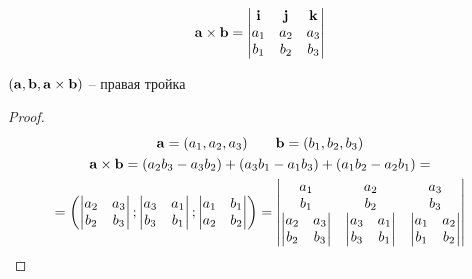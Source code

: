 \begin{remark}
    \[\mathbf{a} \times \mathbf{b} =
        \begin{vmatrix}
            \mathbf{i} & \mathbf{j} & \mathbf{k} \\
            a_1 & a_2 & a_3 \\
            b_1 & b_2 & b_3 \\
        \end{vmatrix}\]
\end{remark}

\begin{theorem}
    $(\mathbf{a}, \mathbf{b}, \mathbf{a} \times\mathbf{b})$ -- правая тройка
\end{theorem}
\begin{proof}
    \begin{gather*}
        \mathbf{a} = (a_1, a_2, a_3) \qquad \mathbf{b} = (b_1, b_2,b_3)\\
        \mathbf{a} \times \mathbf{b} =(a_2 b_3 - a_3 b_2) + (a_3 b_1 - a_1 b_3) + (a_1b_2 - a_2 b_1) =\\
        =\left(
        \begin{vmatrix}
            a_2 & a_3 \\
            b_2 & b_3
        \end{vmatrix};
        \begin{vmatrix}
            a_3 & a_1 \\
            b_3 & b_1
        \end{vmatrix};
        \begin{vmatrix}
            a_1 & b_1 \\
            a_2 & b_2
        \end{vmatrix}
        \right)
        = \begin{vmatrix}
            a_1             & a_2 & a_3 \\
            b_1             & b_2 & b_3 \\
            \begin{vmatrix}
                a_2 & a_3 \\
                b_2 & b_3
            \end{vmatrix} &
            \begin{vmatrix}
                a_3 & a_1 \\
                b_3 & b_1
            \end{vmatrix} &
            \begin{vmatrix}
                a_1 & a_2 \\
                b_1 & b_2
            \end{vmatrix}

\end{vmatrix}
\end{gather*}
\end{proof}
